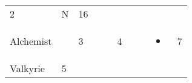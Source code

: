 \documentclass[12pt]{article}
\newcommand{\indexClass}[1]{\index{#1}}
\newcommand{\class}[1]{#1\indexClass{#1}}
\begin{document}
\begin{longtable}[]{@{}llllllllll@{}}
\begin{minipage}[t]{0.06\columnwidth}
2
\strut\end{minipage} &
\begin{minipage}[t]{0.07\columnwidth}\raggedright\strut
N
\strut\end{minipage} &
\begin{minipage}[t]{0.08\columnwidth}\raggedright\strut
16
\strut\end{minipage}\tabularnewline
\begin{minipage}[t]{0.13\columnwidth}\raggedright\strut
\class{Alchemist}
\strut\end{minipage} &
\begin{minipage}[t]{0.06\columnwidth}\raggedright\strut
\strut\end{minipage} &
\begin{minipage}[t]{0.06\columnwidth}\raggedright\strut
3
\strut\end{minipage} &
\begin{minipage}[t]{0.06\columnwidth}\raggedright\strut
\strut\end{minipage} &
\begin{minipage}[t]{0.06\columnwidth}\raggedright\strut
\strut\end{minipage} &
\begin{minipage}[t]{0.06\columnwidth}\raggedright\strut
4
\strut\end{minipage} &
\begin{minipage}[t]{0.06\columnwidth}\raggedright\strut
\strut\end{minipage} &
\begin{minipage}[t]{0.06\columnwidth}\raggedright\strut
\strut\end{minipage} &
\begin{minipage}[t]{0.07\columnwidth}\raggedright\strut
\begin{itemize}
\item
\end{itemize}
\strut\end{minipage} &
\begin{minipage}[t]{0.08\columnwidth}\raggedright\strut
7
\strut\end{minipage}\tabularnewline
\begin{minipage}[t]{0.13\columnwidth}\raggedright\strut
\class{Valkyrie}
\strut\end{minipage} &
\begin{minipage}[t]{0.06\columnwidth}\raggedright\strut
5
\strut\end{minipage} &
\begin{minipage}[t]{0.06\columnwidth}\raggedright\strut

\end{minipage}
\end{longtable}
\end{document}
